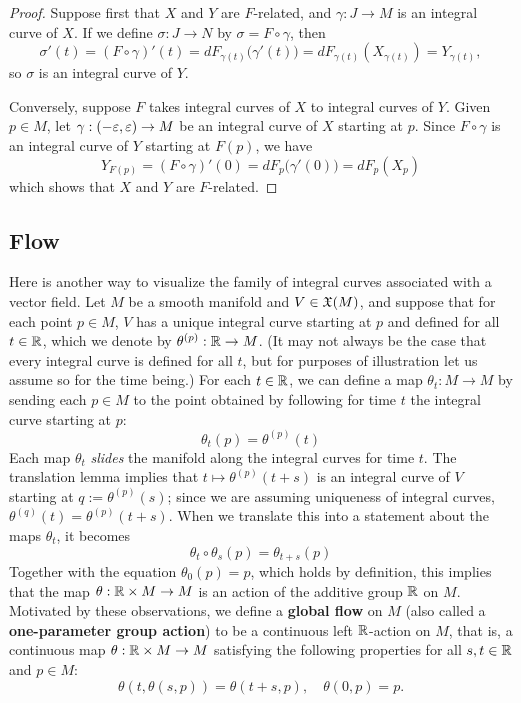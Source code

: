 \begin{proof}
Suppose first that $X$ and $Y$ are $F$-related, and  $\gamma:J\to M$ is an integral curve of $X$. If we define $\sigma:J\to N$ by $\sigma=F\circ\gamma$, then
\[\sigma'(t)=(F\circ\gamma)'(t)=dF_{\gamma(t)}\big(\gamma'(t)\big)=dF_{\gamma(t)}(X_{\gamma(t)})=Y_{\gamma(t)},\]
so $\sigma$ is an integral curve of $Y$.\par
Conversely, suppose $F$ takes integral curves of $X$ to integral curves of $Y$. Given $p\in M$, let $\gamma:(-\varepsilon,\varepsilon)\to M$ be an integral curve of $X$ starting at $p$. Since $F\circ\gamma$ is an integral curve of $Y$ starting at $F(p)$, we have
\[Y_{F(p)}=(F\circ\gamma)'(0)=dF_{p}\big(\gamma'(0)\big)=dF_p(X_p)\]
which shows that $X$ and $Y$ are $F$-related.
\end{proof}
\subsection{Flow}
Here is another way to visualize the family of integral curves associated with a vector field. Let $M$ be a smooth manifold and $V\in\mathfrak{X}(M)$, and suppose that for each point $p\in M$, $V$ has a unique integral curve starting at $p$ and defined for all $t\in\mathbb{R}$, which we denote by $\theta^{(p)}:\mathbb{R}\to M$. (It may not always be the case that every integral curve is defined for all $t$, but for purposes of illustration let us assume so for the time being.) For each $t\in\mathbb{R}$, we can define a map $\theta_t:M\to M$ by sending each $p\in M$ to the point obtained by following for time $t$ the integral curve starting at $p$:
\[\theta_t(p)=\theta^{(p)}(t)\]
Each map $\theta_t$ \textit{slides} the manifold along the integral curves for time $t$. The translation lemma implies that $t\mapsto\theta^{(p)}(t+s)$ is an integral curve of $V$ starting at $q:=\theta^{(p)}(s)$; since we are assuming uniqueness of integral curves, $\theta^{(q)}(t)=\theta^{(p)}(t+s)$. When we translate this into a statement about the maps $\theta_t$, it becomes
\[\theta_t\circ\theta_s(p)=\theta_{t+s}(p)\]
Together with the equation $\theta_0(p)=p$, which holds by definition, this
implies that the map $\theta:\mathbb{R}\times M\to M$ is an action of the additive group $\mathbb{R}$ on $M$. Motivated by these observations, we define a \textbf{global flow} on $M$ (also called a \textbf{one-parameter group action}) to be a continuous left $\mathbb{R}$-action on $M$, that is, a continuous map $\theta:\mathbb{R}\times M\to M$ satisfying the following properties for all $s,t\in\mathbb{R}$ and $p\in M$:
\[\theta(t,\theta(s,p))=\theta(t+s,p),\quad\theta(0,p)=p.\]
